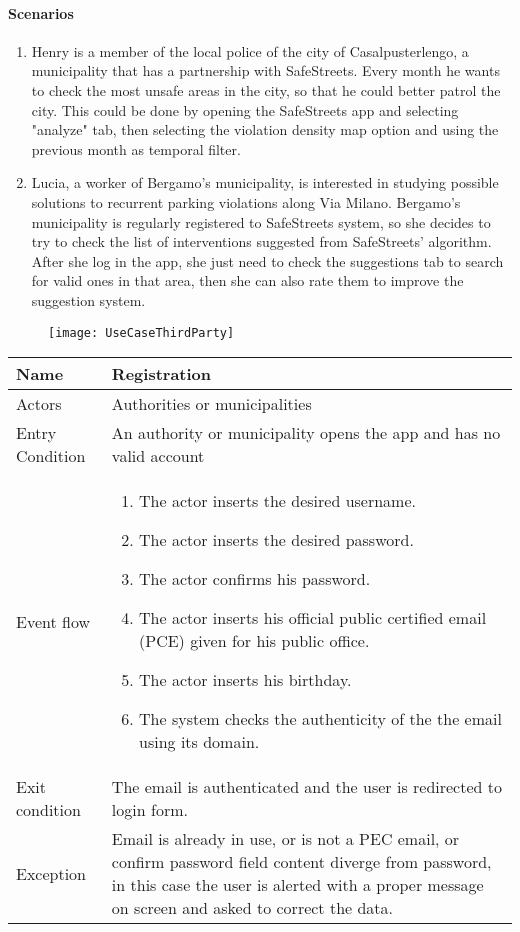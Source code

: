 \paragraph{Scenarios}
\begin{enumerate}
    \item Henry is a member of the local police of the city of Casalpusterlengo, a municipality that has a partnership with SafeStreets. Every month he wants to check the most unsafe areas in the city, so that he could better patrol the city. This could be done by opening the SafeStreets app and selecting "analyze" tab, then selecting the violation density map option and using the previous month as temporal filter.
    
    \item Lucia, a worker of Bergamo's municipality, is interested in studying possible solutions to recurrent parking violations along Via Milano. Bergamo's municipality is regularly registered to SafeStreets system, so she decides to try to check the list of interventions suggested from SafeStreets' algorithm. After she log in the app, she just need to check the suggestions tab to search for valid ones in that area, then she can also rate them to improve the suggestion system.
\end{enumerate}

\begin{figure}[H]
        \centering
        \texttt{[image: UseCaseThirdParty]}
\end{figure}

\begin{tabular}{|p{3.7cm}|p{11cm}|}
\hline
Name & Registration\\
\hline
Actors & Authorities or municipalities\\
\hline
Entry Condition & An authority or municipality opens the app and has no valid account\\
\hline
Event flow & \begin{enumerate}
                \item The actor inserts the desired username.
                \item The actor inserts the desired password.
                \item The actor confirms his password.
                \item The actor inserts his official public certified email (PCE) given for his public office.
                \item The actor inserts his birthday.
                \item The system checks the authenticity of the the email using its domain.
            \end{enumerate}\\
\hline
Exit condition & The email is authenticated and the user is redirected to login form.\\
\hline
Exception & Email is already in use, or is not a PEC email, or confirm password field content diverge from password, in this case the user is alerted with a proper message on screen and asked to correct the data.\\
\hline
\end{tabular}

